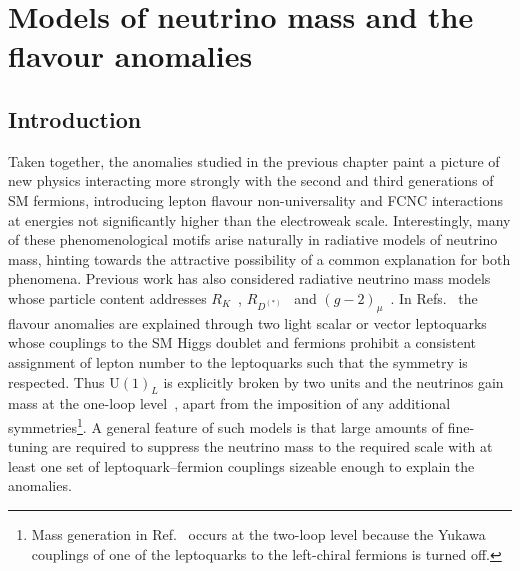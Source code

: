 \graphicspath{{img/chapter_5/}}

\chapter{Models of neutrino mass and the flavour anomalies}
\label{chapter:neutrino-mass-and-flavour-anomalies}

\section{Introduction}

Taken together, the anomalies studied in the previous chapter paint a picture of
new physics interacting more strongly with the second and third generations of
SM fermions, introducing lepton flavour non-universality and FCNC interactions
at energies not significantly higher than the electroweak scale. Interestingly,
many of these phenomenological motifs arise naturally in radiative models of
neutrino mass, hinting towards the attractive possibility of a common
explanation for both phenomena. Previous work has also considered radiative
neutrino mass models whose particle content addresses $R_{K}$~\cite{Pas:2015hca,
  Cheung:2016fjo, Cheung:2017efc, Cheung:2016frv, Popov:2016fzr},
$R_{D^{(*)}}$~\cite{Deppisch:2016qqd, Popov:2016fzr} and
$(g-2)_\mu$~\cite{Babu:2010vp, Cheung:2016fjo, Cheung:2017efc, Cheung:2016frv,
  Popov:2016fzr}. In Refs.~\cite{Pas:2015hca, Deppisch:2016qqd} the flavour
anomalies are explained through two light scalar or vector leptoquarks whose
couplings to the SM Higgs doublet and fermions prohibit a consistent assignment
of lepton number to the leptoquarks such that the symmetry is respected. Thus
$\mathrm{U}(1)_L$ is explicitly broken by two units and the neutrinos gain mass
at the one-loop level~\cite{AristizabalSierra:2007nf}, apart from the imposition
of any additional symmetries\footnote{Mass generation in Ref.~\cite{Babu:2010vp}
  occurs at the two-loop level because the Yukawa couplings of one of the
  leptoquarks to the left-chiral fermions is turned off.}. A general feature of
such models is that large amounts of fine-tuning are required to suppress the
neutrino mass to the required scale with at least one set of leptoquark--fermion
couplings sizeable enough to explain the anomalies.

